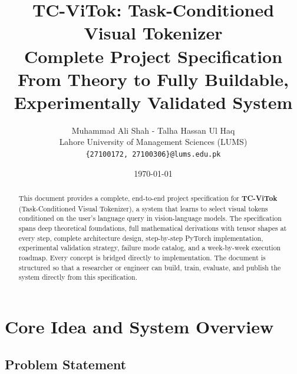 \documentclass[11pt,a4paper]{article}
\begin{document}

\title{
  \textbf{TC-ViTok: Task-Conditioned Visual Tokenizer} \\[0.4em]
  \Large Complete Project Specification \\[0.3em]
  \large From Theory to Fully Buildable, Experimentally Validated System
}

\author{
  Muhammad Ali Shah - Talha Hassan Ul Haq \\[0.3em]
  Lahore University of Management Sciences (LUMS) \\
  \texttt{\{27100172, 27100306\}@lums.edu.pk}
}

\date{\today}

\maketitle
\thispagestyle{empty}

\begin{abstract}
This document provides a complete, end-to-end project specification for
\textbf{TC-ViTok} (Task-Conditioned Visual Tokenizer), a system that learns
to select visual tokens conditioned on the user's language query in
vision-language models. The specification spans deep theoretical
foundations, full mathematical derivations with tensor shapes at every step,
complete architecture design, step-by-step PyTorch implementation,
experimental validation strategy, failure mode catalog, and a week-by-week
execution roadmap. Every concept is bridged directly to implementation.
The document is structured so that a researcher or engineer can build,
train, evaluate, and publish the system directly from this specification.
\end{abstract}

\tableofcontents
\newpage

\section{Core Idea and System Overview}
\label{sec:overview}

\subsection{Problem Statement}
\end{document}
